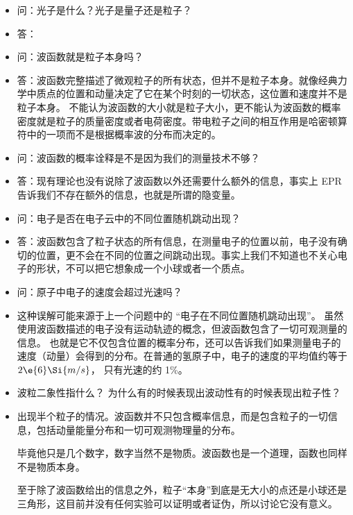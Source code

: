 \begin{itemize}
\item 问：光子是什么？光子是量子还是粒子？
\item 答：

\item 问：波函数就是粒子本身吗？
\item 答：波函数完整描述了微观粒子的所有状态，但并不是粒子本身。就像经典力学中质点的位置和动量决定了它在某个时刻的一切状态，这位置和速度并不是粒子本身。 不能认为波函数的大小就是粒子大小，更不能认为波函数的概率密度就是粒子的质量密度或者电荷密度。带电粒子之间的相互作用是哈密顿算符中的一项而不是根据概率波的分布而决定的。

\item 问：波函数的概率诠释是不是因为我们的测量技术不够？

\item 答：现有理论也没有说除了波函数以外还需要什么额外的信息，事实上 EPR 告诉我们不存在额外的信息，也就是所谓的隐变量。

\item 问：电子是否在电子云中的不同位置随机跳动出现？

\item 答：波函数包含了粒子状态的所有信息，在测量电子的位置以前，电子没有确切的位置，更不会在不同的位置之间跳动出现。事实上我们不知道也不关心电子的形状，不可以把它想象成一个小球或者一个质点。

\item 问：原子中电子的速度会超过光速吗？

\item 这种误解可能来源于上一个问题中的 “电子在不同位置随机跳动出现”。 虽然使用波函数描述的电子没有运动轨迹的概念，但波函数包含了一切可观测量的信息。 也就是它不仅包含位置的概率分布，还可以告诉我们如果测量电子的速度（动量）会得到的分布。在普通的氢原子中，电子的速度的平均值约等于 $2\e{6}\Si{m/s}$， 只有光速的约 1\%。

\item 波粒二象性指什么？ 为什么有的时候表现出波动性有的时候表现出粒子性？

\item 出现半个粒子的情况。波函数并不只包含概率信息，而是包含粒子的一切信息，包括动量能量分布和一切可观测物理量的分布。

毕竟他只是几个数字，数字当然不是物质。波函数也是一个道理，函数也同样不是物质本身。

至于除了波函数给出的信息之外，粒子“本身”到底是无大小的点还是小球还是三角形，这目前并没有任何实验可以证明或者证伪，所以讨论它没有意义。


\end{itemize}
